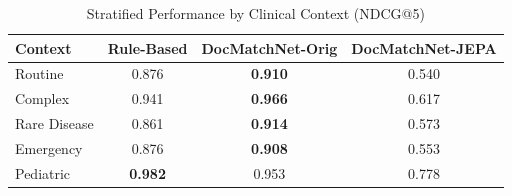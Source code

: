 \begin{table}[t]
\centering
\caption{Stratified Performance by Clinical Context (NDCG@5)}
\label{tab:stratified}
\begin{tabular}{@{}lccc@{}}
\toprule
\textbf{Context} & \textbf{Rule-Based} & \textbf{DocMatchNet-Orig} & \textbf{DocMatchNet-JEPA} \\
\midrule
Routine & 0.876 & \textbf{0.910} & 0.540 \\
Complex & 0.941 & \textbf{0.966} & 0.617 \\
Rare Disease & 0.861 & \textbf{0.914} & 0.573 \\
Emergency & 0.876 & \textbf{0.908} & 0.553 \\
Pediatric & \textbf{0.982} & 0.953 & 0.778 \\
\bottomrule
\end{tabular}
\end{table}
